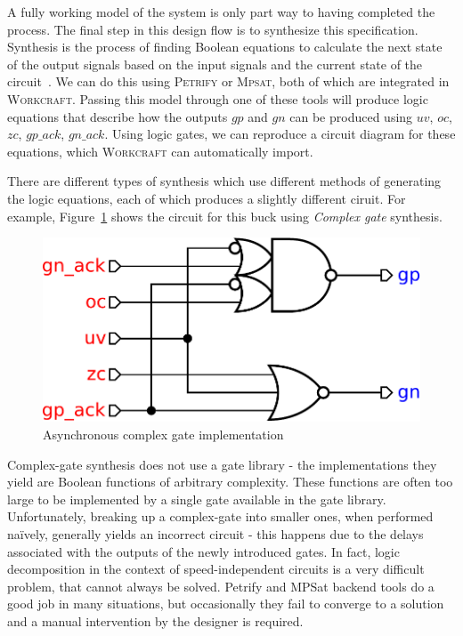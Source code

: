 \documentclass[british,compsoc]{IEEEtran}
\newcommand{\noun}[1]{\textsc{#1}}
\begin{document}

A fully working model of the system is only part way to having completed
the process. The final step in this design flow is to synthesize this
specification. Synthesis is the process of finding Boolean equations to calculate
the next state of the output signals based on the input signals and
the current state of the circuit~\cite{Cortadella}. We can do this
using \noun{Petrify} or \noun{Mpsat}, both of which are integrated
in \noun{Workcraft}. Passing this model through one of these tools
will produce logic equations that describe how the outputs $gp$ and
$gn$ can be produced using $uv$, $oc$, $zc$, $gp\_ack$, $gn\_ack$.
Using logic gates, we can reproduce a circuit diagram for these equations, which \noun{Workcraft} can automatically import.

There are different types of synthesis which use different methods of generating the logic equations,
each of which produces a slightly different ciruit. For example, Figure~\ref{fig:complex-gate-circuit} shows the
circuit for this buck using \emph{Complex gate} synthesis.

\begin{figure}[h]
\begin{centering}
\includegraphics[scale=0.3]{Images/complex-gate-circuit-buck}
\par\end{centering}

\protect\caption{\label{fig:complex-gate-circuit}Asynchronous complex gate implementation}
\end{figure}

Complex-gate synthesis does not use a gate library - the implementations they yield are Boolean functions of arbitrary complexity. These functions are often too
large to be implemented by a single gate available in the gate library. Unfortunately, breaking up a complex-gate into smaller ones, when performed naïvely, generally yields an incorrect
circuit - this happens due to the delays associated with the outputs of the newly introduced gates. In fact, logic decomposition in the context of speed-independent circuits is a very
difficult problem, that cannot always be solved. Petrify and MPSat backend tools do a good job in many situations, but occasionally they fail to converge to a solution and a manual
intervention by the designer is required.
\end{document}
